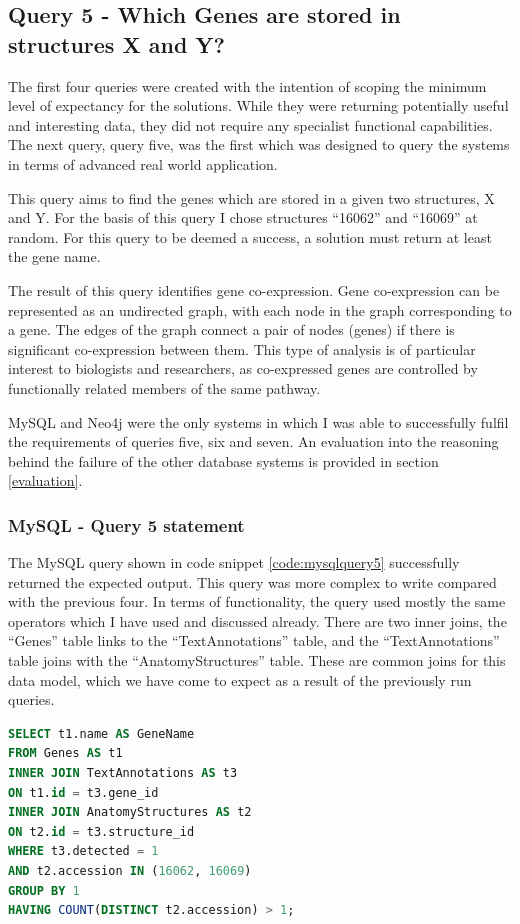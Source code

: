 \subsection*{Query 5 - Which Genes are stored in structures X and Y?}\label{query5}
The first four queries were created with the intention of scoping the minimum level of expectancy for the solutions. While they were returning potentially useful and interesting data, they did not require any specialist functional capabilities. The next query, query five, was the first which was designed to query the systems in terms of advanced real world application.

This query aims to find the genes which are stored in a given two structures, X and Y. For the basis of this query I chose structures ``16062'' and ``16069'' at random. For this query to be deemed a success, a solution must return at least the gene name.

The result of this query identifies gene co-expression. Gene co-expression can be represented as an undirected graph, with each node in the graph corresponding to a gene. The edges of the graph connect a pair of nodes (genes) if there is significant co-expression between them. This type of analysis is of particular interest to biologists and researchers, as co-expressed genes are controlled by functionally related members of the same pathway.

MySQL and Neo4j were the only systems in which I was able to successfully fulfil the requirements of queries five, six and seven. An evaluation into the reasoning behind the failure of the other database systems is provided in section \ref{evaluation}.

\subsubsection*{MySQL - Query 5 statement}\label{mysqlquery5statement}
The MySQL query shown in code snippet \ref{code:mysqlquery5} successfully returned the expected output. This query was more complex to write compared with the previous four. In terms of functionality, the query used mostly the same operators which I have used and discussed already. There are two inner joins, the ``Genes'' table links to the ``TextAnnotations'' table, and the ``TextAnnotations'' table joins with the ``AnatomyStructures'' table. These are common joins for this data model, which we have come to expect as a result of the previously run queries.

\begin{lstlisting}[language=SQL, caption=MySQL query 5 statement. Which Genes are stored in structures X and Y?., label=code:mysqlquery5]
SELECT t1.name AS GeneName
FROM Genes AS t1
INNER JOIN TextAnnotations AS t3
ON t1.id = t3.gene_id
INNER JOIN AnatomyStructures AS t2
ON t2.id = t3.structure_id
WHERE t3.detected = 1
AND t2.accession IN (16062, 16069)
GROUP BY 1
HAVING COUNT(DISTINCT t2.accession) > 1;
\end{lstlisting}

